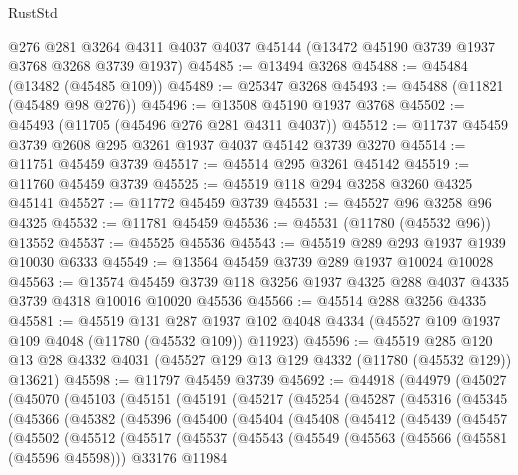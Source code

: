 \begin{lexlean}{RustStd}
\begin{coremodule}
    @276
    @281
    @3264
    @4311
    @4037
    @4037
    @45144
    (@13472 @45190 @3739 @1937 @3768 @3268 @3739 @1937)
@45485 := @13494 @3268
@45488 := @45484 (@13482 (@45485 @109))
@45489 := @25347 @3268
@45493 := @45488 (@11821 (@45489 @98 @276))
@45496 := @13508 @45190 @1937 @3768
@45502 := @45493 (@11705 (@45496 @276 @281 @4311 @4037))
@45512 := @11737 @45459 @3739 @2608 @295 @3261 @1937 @4037 @45142 @3739 @3270
@45514 := @11751 @45459 @3739
@45517 := @45514 @295 @3261 @45142
@45519 := @11760 @45459 @3739
@45525 := @45519 @118 @294 @3258 @3260 @4325 @45141
@45527 := @11772 @45459 @3739
@45531 := @45527 @96 @3258 @96 @4325
@45532 := @11781 @45459
@45536 := @45531 (@11780 (@45532 @96)) @13552
@45537 := @45525 @45536
@45543 := @45519 @289 @293 @1937 @1939 @10030 @6333
@45549 := @13564 @45459 @3739 @289 @1937 @10024 @10028
@45563 := @13574
    @45459
    @3739
    @118
    @3256
    @1937
    @4325
    @288
    @4037
    @4335
    @3739
    @4318
    @10016
    @10020
    @45536
@45566 := @45514 @288 @3256 @4335
@45581 := @45519
    @131
    @287
    @1937
    @102
    @4048
    @4334
    (@45527 @109 @1937 @109 @4048 (@11780 (@45532 @109)) @11923)
@45596 := @45519
    @285
    @120
    @13
    @28
    @4332
    @4031
    (@45527 @129 @13 @129 @4332 (@11780 (@45532 @129)) @13621)
@45598 := @11797 @45459 @3739
@45692 := @44918
    (@44979
      (@45027
        (@45070
          (@45103
            (@45151
              (@45191
                (@45217
                  (@45254
                    (@45287
                      (@45316
                        (@45345
                          (@45366
                            (@45382
                              (@45396
                                (@45400
                                  (@45404
                                    (@45408
                                      (@45412
                                        (@45439
                                          (@45457
                                            (@45502
                                              (@45512
                                                (@45517
                                                  (@45537
                                                    (@45543
                                                      (@45549
                                                        (@45563
                                                          (@45566 (@45581 (@45596 @45598)))
                                                          @33176
                                                          @11984

\end{coremodule}
\end{lexlean}
